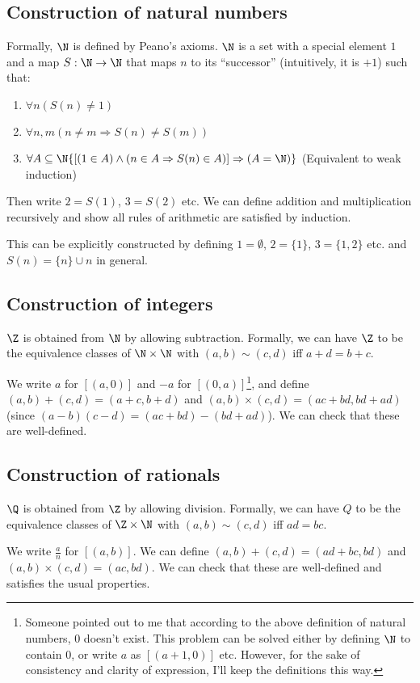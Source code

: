 \documentclass[a4paper]{article}
\begin{document}
  \subsection{Construction of natural numbers}
  \begin{defi}
    Formally, $\N$ is defined by Peano's axioms. $\N$ is a set with a special element $1$ and a map $S: \N \to \N$ that maps $n$ to its ``successor'' (intuitively, it is $+1$) such that:
    \begin{enumerate}
      \item $\forall n(S(n) \not= 1)$
      \item $\forall n, m(n \not= m\Rightarrow S(n)\not= S(m))$
      \item $\forall A\subseteq \N\{[(1\in A)\wedge (n\in A\Rightarrow S(n)\in A)]\Rightarrow (A = \N)\}$ (Equivalent to weak induction)
    \end{enumerate}
    Then write $2 = S(1)$, $3 = S(2)$ etc. We can define addition and multiplication recursively and show all rules of arithmetic are satisfied by induction.

    This can be explicitly constructed by defining $1 = \emptyset$, $2 = \{1\}$, $3 = \{1, 2\}$ etc. and $S(n) = \{n\}\cup n$ in general.
  \end{defi}

  \subsection{Construction of integers}
  \begin{defi}[Integers]
    $\Z$ is obtained from $\N$ by allowing subtraction. Formally, we can have $\Z$ to be the equivalence classes of $\N\times \N$ with $(a, b) \sim (c, d)$ iff $a + d = b + c$.

    We write $a$ for $[(a, 0)]$ and $-a$ for $[(0, a)]$\footnote{Someone pointed out to me that according to the above definition of natural numbers, $0$ doesn't exist. This problem can be solved either by defining $\N$ to contain 0, or write $a$ as $[(a + 1, 0)]$ etc. However, for the sake of consistency and clarity of expression, I'll keep the definitions this way.}, and define $(a, b) + (c, d) = (a + c, b + d)$ and $(a, b)\times (c, d) = (ac + bd, bd + ad)$ (since $(a - b)(c - d) = (ac + bd) - (bd + ad)$). We can check that these are well-defined.
  \end{defi}

  \subsection{Construction of rationals}
  \begin{defi}[Rationals]
    $\Q$ is obtained from $\Z$ by allowing division. Formally, we can have $Q$ to be the equivalence classes of $\Z \times \N$ with $(a, b) \sim (c, d)$ iff $ad = bc$.

    We write $\frac{a}{n}$ for $[(a, b)]$. We can define $(a, b) + (c, d) = (ad + bc, bd)$ and $(a, b)\times (c, d) = (ac, bd)$. We can check that these are well-defined and satisfies the usual properties. 
  \end{defi}
\end{document}
